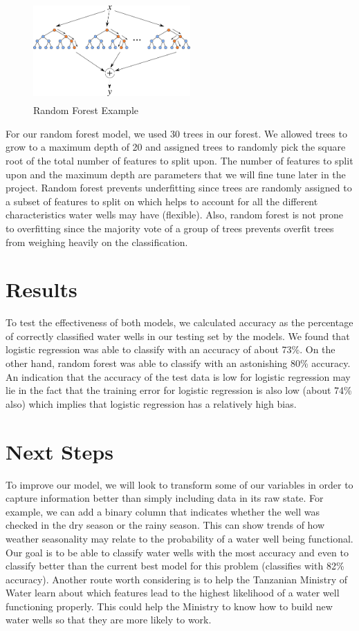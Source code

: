 \documentclass[10pt]{SelfArx} %
\begin{document}
\setlength{\belowcaptionskip}{-10pt}
\begin{figure}[ht]\centering
\includegraphics[width=6cm, height=3.8cm]{rf.png}
\caption{Random Forest Example}
\label{fig:rf}
\end{figure}

For our random forest model,  we used 30 trees in our forest. We allowed trees to grow to a maximum depth of 20 and assigned trees to randomly pick the square root of the total number of features to split upon. The number of features to split upon and the maximum depth are parameters that we will fine tune later in the project. Random forest prevents underfitting since trees are randomly assigned to a subset of features to split on which helps to account for all the different characteristics water wells may have (flexible). Also, random forest is not prone to overfitting since the majority vote of a group of trees prevents overfit trees from weighing heavily on the classification. 

\section{Results}

To test the effectiveness of both models, we calculated accuracy as the percentage of correctly classified water wells in our testing set by the models. We found that logistic regression was able to classify with an accuracy of about 73\%. On the other hand, random forest was able to classify with an astonishing 80\% accuracy. An indication that the accuracy of the test data is low for logistic regression may lie in the fact that the training error for logistic regression is also low (about 74\% also) which implies that logistic regression has a relatively high bias.

\section{Next Steps}

To improve our model, we will look to transform some of our variables in order to capture information better than simply including data in its raw state. For example, we can add a binary column that indicates whether the well was checked in the dry season or the rainy season. This can show trends of how weather seasonality may relate to the probability of a water well being functional. Our goal is to be able to classify water wells with the most accuracy and even to classify better than the current best model for this problem (classifies with 82\% accuracy). Another route worth considering is to help the Tanzanian Ministry of Water learn about which features lead to the highest likelihood of a water well functioning properly. This could help the Ministry to know how to build new water wells so that they are more likely to work.
\end{document}
